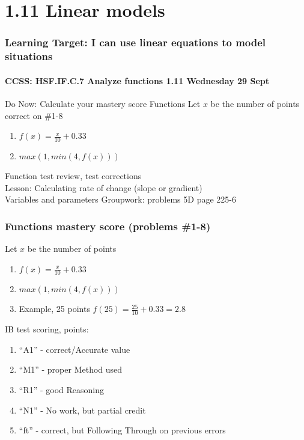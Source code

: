 \documentclass{beamer}
\begin{document}
  \section{1.11 Linear models}
  \frame
  {
    \frametitle{Learning Target: I can use linear equations to model situations}
    \framesubtitle{CCSS: HSF.IF.C.7 Analyze functions \hfill \alert{1.11 Wednesday 29 Sept}}

    \begin{block}{Do Now: Calculate your mastery score Functions}
        Let $x$ be the number of points correct on \#1-8
        \begin{enumerate}
          \item $\displaystyle f(x)=\frac{x}{10} + 0.33$
          \item $max(1,min(4,f(x)))$
        \end{enumerate}
    \end{block}\vspace{0.5cm}
    Function test review, test corrections\\[0.5cm]
    Lesson: Calculating rate of change (slope or gradient)\\[0.25cm]
    Variables and parameters
    Groupwork: problems 5D page 225-6
  }

  \frame
  {
    \frametitle{Functions mastery score (problems  \#1-8)}

    \begin{block}{Let $x$ be the number of points}
      
      \begin{enumerate}
        \item $\displaystyle f(x)=\frac{x}{10} + 0.33$
        \item $max(1,min(4,f(x)))$
        \item Example, 25 points $\displaystyle f(25)=\frac{25}{10} + 0.33=2.8$
      \end{enumerate}
    \end{block}
    IB test scoring, points:
    \begin{enumerate}
      \item ``A1'' - correct/Accurate value
      \item ``M1'' - proper Method used
      \item  ``R1'' - good Reasoning
      \item  ``N1'' - No work, but partial credit
      \item  ``ft'' - correct, but Following Through on previous errors
    \end{enumerate}

  }
\end{document}
